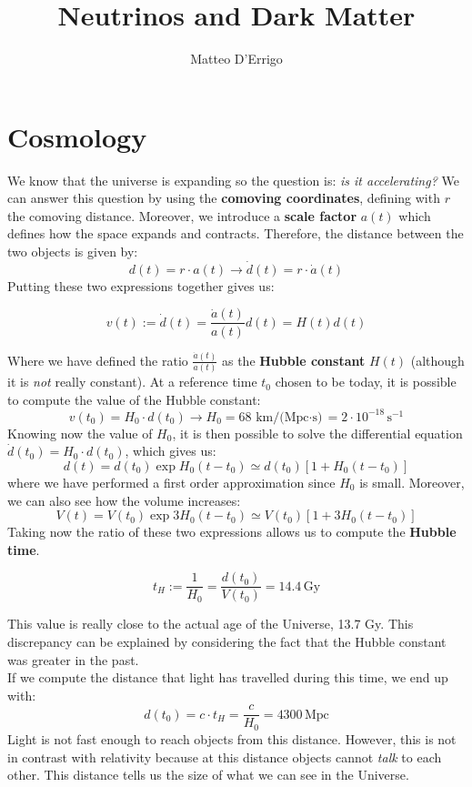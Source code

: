 \documentclass[10.75pt,a4paper,openright,bottom=2cm]{article}
\title{\textbf{Neutrinos and Dark Matter}}
\author{Matteo D'Errigo}
\newcommand{\beginbox}[1]{\begin{tcolorbox}[width=\textwidth,colback={black!40},title={#1},colbacktitle={purple!55},coltitle=black]}
\renewcommand{\endbox}{\end{tcolorbox}\noindent}
\begin{document}
\maketitle
\tableofcontents
\newpage
\section{Cosmology}
We know that the universe is expanding so the question is: \textit{is it accelerating?} We can answer this question by using the \textbf{comoving coordinates}, defining with $r$ the comoving distance. Moreover, we introduce a \textbf{scale factor} $a(t)$ which defines how the space expands and contracts. Therefore, the distance between the two objects is given by:
\[
d(t)=r\cdot a(t)\to\Dot{d}(t)=r\cdot\Dot{a}(t)
\]
Putting these two expressions together gives us:
\beginbox{Hubble Constant}
\[
v(t):=\Dot{d}(t)=\frac{\Dot{a}(t)}{a(t)}d(t)=H(t)d(t)
\]
\endbox
Where we have defined the ratio $\frac{\Dot{a}(t)}{a(t)}$ as the \textbf{Hubble constant} $H(t)$ (although it is \textit{not} really constant). At a reference time $t_0$ chosen to be today, it is possible to compute the value of the Hubble constant:
\[
v(t_0)=H_0\cdot d(t_0)\to H_0=68\,\text{km/(Mpc$\cdot$s)}=2\cdot10^{-18}\,\text{s$^{-1}$}
\]
Knowing now the value of $H_0$, it is then possible to solve the differential equation\\
$\Dot{d}(t_0)=H_0\cdot d(t_0)$, which gives us:
\[
d(t)=d(t_0)\exp{H_0(t-t_0)}\simeq d(t_0)[1+H_0(t-t_0)]
\]
where we have performed a first order approximation since $H_0$ is small. Moreover, we can also see how the volume increases:
\[
V(t)=V(t_0)\exp{3H_0(t-t_0)}\simeq V(t_0)[1+3H_0(t-t_0)]
\]
Taking now the ratio of these two expressions allows us to compute the \textbf{Hubble time}.
\beginbox{Hubble Time}
\[
t_H:=\frac{1}{H_0}=\frac{d(t_0)}{V(t_0)}=14.4\,\text{Gy}
\]
\endbox
This value is really close to the actual age of the Universe, 13.7 Gy. This discrepancy can be explained by considering the fact that the Hubble constant was greater in the past.\\
If we compute the distance that light has travelled during this time, we end up with:
\[
d(t_0)=c\cdot t_H=\frac{c}{H_0}=4300\,\text{Mpc}
\]
Light is not fast enough to reach objects from this distance. However, this is not in contrast with relativity because at this distance objects cannot \textit{talk} to each other. This distance tells us the size of what we can see in the Universe.\\
\end{document}
